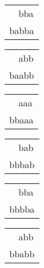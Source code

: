 \begin{tabular}{|l|} \hline
\ \ bba \\
babba \\
\hline
\end{tabular} 
\begin{tabular}{|l|} \hline
\ \ abb \\
baabb \\
\hline
\end{tabular} 
\begin{tabular}{|l|} \hline
\ \ aaa \\
bbaaa \\
\hline
\end{tabular} 
\begin{tabular}{|l|} \hline
\ \ bab \\
bbbab \\
\hline
\end{tabular} 
\begin{tabular}{|l|} \hline
\ \ bba \\
bbbba \\
\hline
\end{tabular} 
\begin{tabular}{|l|} \hline
\ \ abb \\
bbabb \\
\hline
\end{tabular} 
